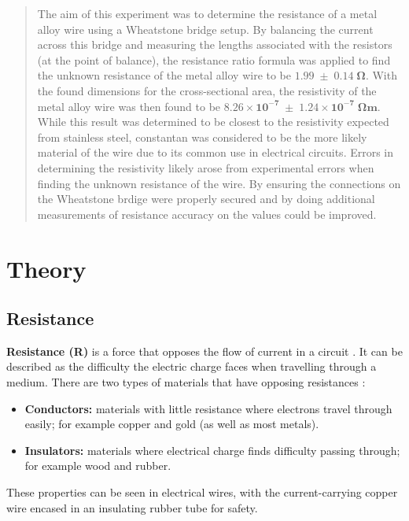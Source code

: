 \documentclass[12pt]{article}
\begin{document}
\setcounter{page}{1}
\tableofcontents

\newpage

\begin{abstract}

The aim of this experiment was to determine the resistance of a metal alloy wire using a Wheatstone bridge setup. By balancing the current across this bridge
and measuring the lengths associated with the resistors (at the point of balance), the resistance ratio formula was applied to find the unknown resistance of the metal alloy wire
to be $\mathbf{1.99 \; \pm \; 0.14 \; \Omega}$. With the found dimensions for the cross-sectional area, the resistivity of the metal alloy wire was then found to be
$\mathbf{8.26 \times 10^{-7} \; \pm \; 1.24 \times 10^{-7} \; \Omega m}$. While this result was determined to be closest to the resistivity expected from stainless steel, constantan
was considered to be the more likely material of the wire due to its common use in electrical circuits. Errors in determining the resistivity likely arose from experimental errors when finding
the unknown resistance of the wire. By ensuring the connections on the Wheatstone brdige were properly secured and by doing additional measurements of resistance accuracy on the values could be improved.

\end{abstract}


\vspace{4cm}

\section{Theory} \label{sec:1}

\subsection{Resistance}

\textbf{Resistance (R)} is a force that opposes the flow of current in a circuit
\cite{flukeresistance,hiokiresistance,britresistance}.
It can be described as the difficulty the electric charge faces when travelling through a medium.
\cite{hiokiresistance}
There are two types of materials that have opposing resistances \cite{flukeresistance}:
\begin{itemize}
    \item \textbf{Conductors:} materials with little resistance where electrons travel through easily; for example copper and gold (as well as most metals).
    \item \textbf{Insulators:} materials where electrical charge finds difficulty passing through; for example wood and rubber.
\end{itemize}
These properties can be seen in electrical wires, with the current-carrying copper wire encased in an insulating rubber tube for safety.
\end{document}
